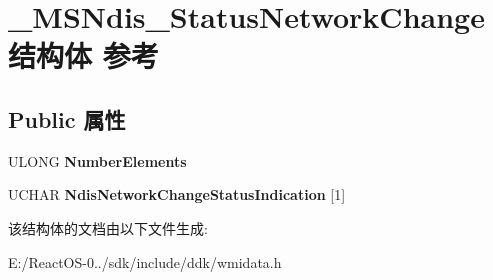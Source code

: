 \hypertarget{struct___m_s_ndis___status_network_change}{}\section{\+\_\+\+M\+S\+Ndis\+\_\+\+Status\+Network\+Change结构体 参考}
\label{struct___m_s_ndis___status_network_change}
\subsection*{Public 属性}
\begin{DoxyCompactItemize}
\item 
\mbox{\label{struct___m_s_ndis___status_network_change_a6f6f6246d124e9c7cc3acf4b759240e7}} 
U\+L\+O\+NG {\bfseries Number\+Elements}
\item 
\mbox{\label{struct___m_s_ndis___status_network_change_adc0d053db049cfab22301469305589b4}} 
U\+C\+H\+AR {\bfseries Ndis\+Network\+Change\+Status\+Indication} \mbox{[}1\mbox{]}
\end{DoxyCompactItemize}


该结构体的文档由以下文件生成\+:\begin{DoxyCompactItemize}
\item 
E\+:/\+React\+O\+S-\/0../sdk/include/ddk/wmidata.\+h\end{DoxyCompactItemize}
